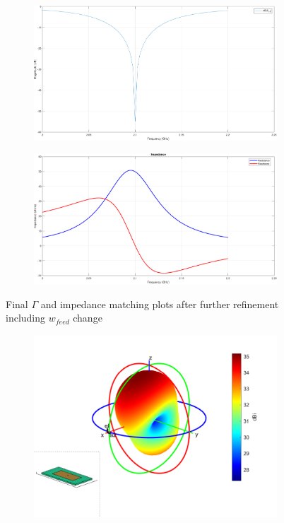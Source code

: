 \documentclass[12pt,a4paper]{article}
\begin{document}
{\begin{figure}[h]
	\begin{center}
		\begin{subfigure}{0.5\linewidth}
			\includegraphics[scale=0.25]{gamma_wfeed.pdf}
		\end{subfigure}
		\begin{subfigure}{0.5\linewidth}
			\includegraphics[scale=0.25]{matching_wfeed.pdf}
		\end{subfigure}
		\caption{\selectfont
		\color{gray}
	Final $\Gamma$ and impedance matching plots after further refinement including $w_{feed}$ change}
\label{fig:Gamma and Z}
	\end{center}  
\end{figure}
\begin{figure}[h]
	\begin{center}
		\begin{subfigure}{0.5\linewidth}
			\includegraphics[scale=0.5]{gain_3D_pifa.pdf}

\end{subfigure}
\end{center}
\end{figure}}
\end{document}
